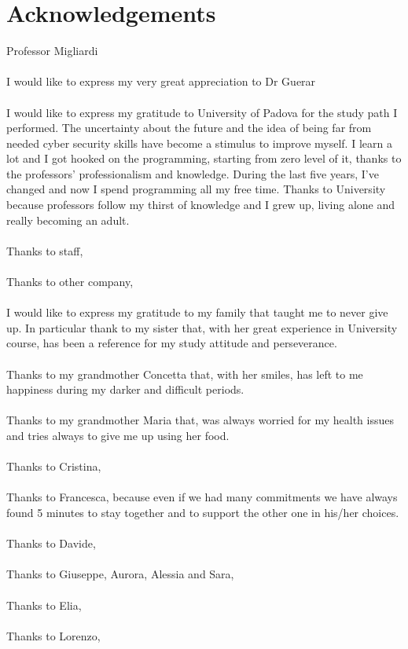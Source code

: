 \chapter*{Acknowledgements}
Professor Migliardi\\\\
I would like to express my very great appreciation to Dr Guerar\\\\
I would like to express my gratitude to University of Padova for the study path I performed. The uncertainty about the future and the idea of being far from needed cyber security skills have become a stimulus to improve myself. I learn a lot and I got hooked on the programming, starting from zero level of it, thanks to the professors' professionalism and knowledge. During the last five years, I've changed and now I spend programming all my free time. Thanks to University because professors follow my thirst of knowledge and I grew up, living alone and really becoming an adult.\\\\
Thanks to staff,\\\\
Thanks to other company,\\\\
I would like to express my gratitude to my family that taught me to never give up. In particular thank to my sister that, with her great experience in University course, has been a reference for my study attitude and perseverance.\\\\
Thanks to my grandmother Concetta that, with her smiles, has left to me happiness during my darker and difficult periods.\\\\
Thanks to my grandmother Maria that, was always worried for my health issues and tries always to give me up using her food. \\\\
Thanks to Cristina,\\\\
Thanks to Francesca, because even if we had many commitments we have always found 5 minutes to stay together and to support the other one in his/her choices.\\\\
Thanks to Davide,\\\\
Thanks to Giuseppe, Aurora, Alessia and Sara,\\\\
Thanks to Elia,\\\\
Thanks to Lorenzo,\\\\